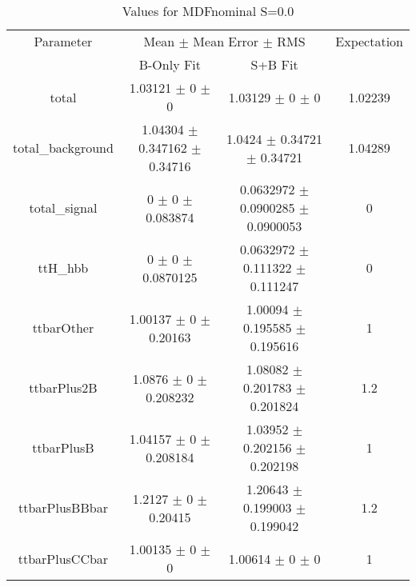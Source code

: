 \begin{table}
\centering
\caption{Values for MDFnominal S=0.0}
\begin{tabular}{cccc}
\toprule
Parameter & \multicolumn{2}{c}{Mean $\pm$ Mean Error $\pm$ RMS} & Expectation\\
 & B-Only Fit & S+B Fit & \\
\midrule
total & \num{1.03121} $\pm$ \num{0} $\pm$ \num{0} & \num{1.03129} $\pm$ \num{0} $\pm$ \num{0} & \num{1.02239}\\
total\_background & \num{1.04304} $\pm$ \num{0.347162} $\pm$ \num{0.34716} & \num{1.0424} $\pm$ \num{0.34721} $\pm$ \num{0.34721} & \num{1.04289}\\
total\_signal & \num{0} $\pm$ \num{0} $\pm$ \num{0.083874} & \num{0.0632972} $\pm$ \num{0.0900285} $\pm$ \num{0.0900053} & \num{0}\\
ttH\_hbb & \num{0} $\pm$ \num{0} $\pm$ \num{0.0870125} & \num{0.0632972} $\pm$ \num{0.111322} $\pm$ \num{0.111247} & \num{0}\\
ttbarOther & \num{1.00137} $\pm$ \num{0} $\pm$ \num{0.20163} & \num{1.00094} $\pm$ \num{0.195585} $\pm$ \num{0.195616} & \num{1}\\
ttbarPlus2B & \num{1.0876} $\pm$ \num{0} $\pm$ \num{0.208232} & \num{1.08082} $\pm$ \num{0.201783} $\pm$ \num{0.201824} & \num{1.2}\\
ttbarPlusB & \num{1.04157} $\pm$ \num{0} $\pm$ \num{0.208184} & \num{1.03952} $\pm$ \num{0.202156} $\pm$ \num{0.202198} & \num{1}\\
ttbarPlusBBbar & \num{1.2127} $\pm$ \num{0} $\pm$ \num{0.20415} & \num{1.20643} $\pm$ \num{0.199003} $\pm$ \num{0.199042} & \num{1.2}\\
ttbarPlusCCbar & \num{1.00135} $\pm$ \num{0} $\pm$ \num{0} & \num{1.00614} $\pm$ \num{0} $\pm$ \num{0} & \num{1}\\
\bottomrule
\end{tabular}
\end{table}